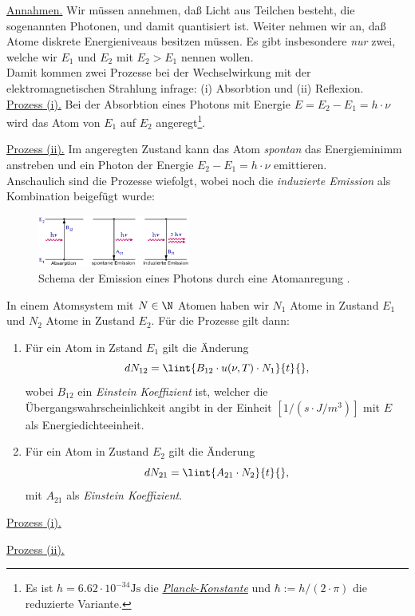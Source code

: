 \documentclass{subfiles}
\begin{document}
                \noindent\underline{Annahmen.} Wir müssen annehmen, daß Licht aus Teilchen besteht, die sogenannten Photonen, und damit quantisiert ist. Weiter nehmen wir an, daß Atome diskrete Energieniveaus besitzen müssen. Es gibt insbesondere \emph{nur} zwei, welche wir $E_1$ und $E_2$ mit $E_2>E_1$ nennen wollen. \\

                Damit kommen zwei Prozesse bei der Wechselwirkung mit der elektromagnetischen Strahlung infrage: (i) Absorbtion und (ii) Reflexion. \\

                \noindent\underline{Prozess (i).} Bei der Absorbtion eines Photons mit Energie $E=E_2-E_1= h\cdot\nu$ wird das Atom von $E_1$ auf $E_2$ angeregt\footnote{Es ist $h=6.62\cdot 10^{-34}\si{\joule\second}$ die \href{https://de.wikipedia.org/wiki/Planck-Konstante}{\emph{Planck-Konstante}} und $\hbar:=h/(2\cdot\pi)$ die reduzierte Variante.}.

                \noindent\underline{Prozess (ii).} Im angeregten Zustand kann das Atom \emph{spontan} das Energieminimm anstreben und ein Photon der Energie $E_2-E_1=h\cdot\nu$ emittieren. \\

                Anschaulich sind die Prozesse wiefolgt, wobei noch die \emph{induzierte Emission} als Kombination beigefügt wurde:
                \begin{figure}
                    \centering
                    \includegraphics[width=5cm]{Bilddateien/AtomPhotonEmission.gif}
                    \caption[short]{Schema der Emission eines Photons durch eine Atomanregung \cite{uniulm:PlanckStrahlung}.}
                \end{figure}
                In einem Atomsystem mit $N\in\N$ Atomen haben wir $N_1$ Atome in Zustand $E_1$ und $N_2$ Atome in Zustand $E_2$. Für die Prozesse gilt dann:\\

                \begin{enumerate}[label=\underline{Prozess (\roman*)}]
                    \item Für ein Atom in Zstand $E_1$ gilt die Änderung 
                    \[dN_{12} =\lint{B_{12}\cdot u(\nu,T)\cdot N_1}{t}{},\]
                    wobei $B_{12}$ ein \emph{Einstein Koeffizient} ist, welcher die Übergangswahrscheinlichkeit angibt in der Einheit $[1/(s\cdot J/m^3)]$ mit $E$ als Energiedichteeinheit. 
                    \item Für ein Atom in Zustand $E_2$ gilt die Änderung
                    \[dN_{21} = \lint{A_{21}\cdot N_2}{t}{},\]
                    mit $A_{21}$ als \emph{Einstein Koeffizient}. 
                \end{enumerate}
                \noindent\underline{Prozess (i).} 

                \noindent\underline{Prozess (ii).} 
\end{document}

